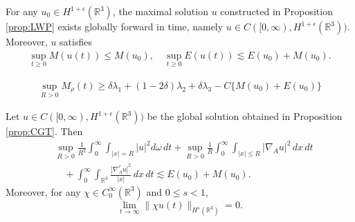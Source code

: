 \documentclass[10pt,a4paper]{amsart}
\newcommand{\R}{\mathbb{R}}
\begin{document}
\begin{proposition}\label{prop:CGT}
	For any $u_0\in H^{1+\epsilon}(\R^3)$, the maximal solution $u$ constructed in Proposition \ref{prop:LWP} exists globally forward in time, namely $u\in C([0,\infty),H^{1+\epsilon}(\R^3))$. Moreover, $u$ satisfies
	\begin{align}
		\label{equ:uniformenergy_2}
		\sup_{t\ge0}M(u(t))\le M(u_0),\quad \sup_{t\ge0}E(u(t))\lesssim E(u_0)+M(u_0).
	\end{align}
\end{proposition}

	\begin{align}
		\label{proof_energy_7}
		\sup_{R>0}M_\rho(t)\ge \delta\lambda_1+(1-2\delta)\lambda_2+\delta\lambda_3-C\{M(u_0)+E(u_0)\}
	\end{align}

\begin{proposition}\label{prop:uniformenergy} Let $u\in C([0,\infty),H^{1+\epsilon}(\R^3))$ be the global solution obtained in Proposition \ref{prop:CGT}. Then
	\begin{align}
		\label{equ:locmasdec}
		&\sup_{R>0}\frac{1}{R^2}\int_0^\infty\int_{|x|=R}|u|^2d\omega\,dt+\sup_{R>0}\frac{1}{R}\int_0^\infty\int_{|x|\le R}|{\nabla_A u}|^2\,dx\,dt\\\nonumber&\quad +\int_0^\infty\int_{\R^3}\frac{|\nabla_A^\tau u|^2}{|x|}\,dx\,dt\lesssim   E(u_0)+M(u_0). 
	\end{align}
	Moreover, for any $\chi\in C_0^\infty(\R^3)$ and $0\le s<1$, 
	\begin{equation}\label{equ:locenedecHs}
		\lim_{t\to\infty}\|\chi u(t)\|_{H^s(\R^3)}=0.
	\end{equation}
\end{proposition}
\end{document}
